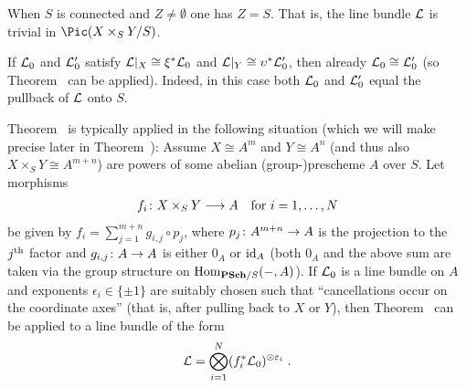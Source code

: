 \documentclass[a4paper,parskip=half,numbers=enddot, DIV=12]{scrreprt}
\begin{document}
\begin{rem}
	\begin{alphanumerate}
		\item When $S$ is connected and $Z\neq\emptyset$ one has $Z=S$. That is, the line bundle $\mathcal{L}$ is trivial in $\Pic(X\times_SY/S)$.
		\item If $\mathcal{L}_0$ and $\mathcal{L}_0'$ satisfy $\mathcal{L}|_X\cong \xi^*\mathcal{L}_0$ and $\mathcal{L}|_Y\cong \upsilon^*\mathcal{L}_0'$, then already $\mathcal{L}_0\cong \mathcal{L}_0'$ (so Theorem~ can be applied). Indeed, in this case both $\mathcal{L}_0$ and $\mathcal{L}_0'$ equal the pullback of $\mathcal{L}$ onto $S$.
		\item Theorem~ is typically applied in the following situation (which we will make precise later in Theorem~): Assume $X\cong A^m$ and $Y\cong A^n$ (and thus also $X\times_SY\cong A^{m+n}$) are powers of some abelian (group-)prescheme $A$ over $S$. Let morphisms
		\begin{align*}
			f_i\colon X\times_SY\morphism A\quad\text{for }i=1,\ldots,N
		\end{align*}
		be given by $f_i=\sum_{j=1}^{m+n}g_{i,j}\circ p_j$, where $p_j\colon A^{m+n}\morphism A$ is the projection to the $j^{\text{th}}$ factor and $g_{i,j}\colon A\morphism A$ is either $0_A$ or $\operatorname{id}_A$ (both $0_A$ and the above sum are taken via the group structure on $\Hom_{\cat{PSch}/S}(-,A)$). If $\mathcal{L}_0$ is a line bundle on $A$ and exponents $\epsilon_i\in\{\pm 1\}$ are suitably chosen such that ``cancellations occur on the coordinate axes'' (that is, after pulling back to $X$ or $Y$), then Theorem~ can be applied to a line bundle of the form 
		\begin{align*}
			\mathcal{L}=\bigotimes_{i=1}^N(f_i^*\mathcal{L}_0)^{\otimes\varepsilon_i}\;.
		\end{align*}
	\end{alphanumerate}
\end{rem}
\end{document}
